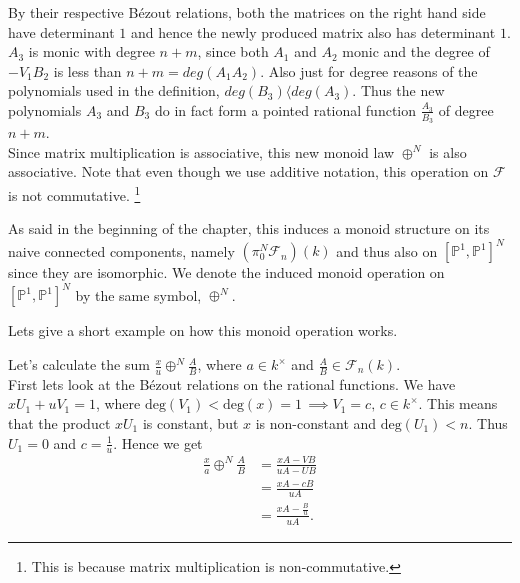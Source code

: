 %
\begin{remark}\label{Rm:N-sums work as expected}
By their respective Bézout relations, both the matrices on the right hand side have determinant \(1\) and hence the newly produced matrix also has determinant \(1\). \(A_3\) is monic with degree \(n+m\), since both \(A_1\) and \(A_2\) monic and the degree of \(-V_1 B_2\) is less than \(n+m = deg(A_1 A_2)\). Also just for degree reasons of the polynomials used in the definition, \(deg(B_3)\langle deg(A_3)\). Thus the new polynomials \(A_3\) and \(B_3\) do in fact form a pointed rational function \(\frac{A_3}{B_3}\) of degree \(n+m\). \\
%
Since matrix multiplication is associative, this new monoid law \(\oplus^N\) is also associative. %
Note that even though we use additive notation, this operation on \(\mathcal{F}\) is not commutative. \footnote{ This is because matrix multiplication is non-commutative.} 
\end{remark}
 
%
\begin{remark}\label{rm:induces monoid on conn components}
%
As said in the beginning of the chapter, this induces a monoid structure on its naive connected components, namely \((\pi_0^N\mathcal{F}_n)(k)\) and thus also on \([\mathbb{P}^1,\mathbb{P}^1]^N\) since they are isomorphic. We denote the induced monoid operation on \([\mathbb{P}^1,\mathbb{P}^1]^N\) by the same symbol, \(\oplus^N\). 
%
\end{remark}
%
Lets give a short example on how this monoid operation works.
\begin{example}\label{Ex:Computing easy N-sums}
Let's calculate the sum \(\frac{x}{u}\oplus^N\frac{A}{B}\), where \(a\in k^{\times}\) and \(\frac{A}{B}\in \mathcal{F}_n(k)\). \\

First lets look at the Bézout relations on the rational functions. We have \(xU_1 + u V_1 = 1\), where \(\text{deg}(V_1) < \text{deg}(x) = 1 \, \implies V_1 = c, \, c \in k^{\times}\). This means that the product \(xU_1\) is constant, but \(x\) is non-constant and \(\text{deg}(U_1) < n\). Thus \(U_1 = 0\) and \(c = \frac{1}{u}\). Hence we get
%
\begin{align*}
\frac{x}{a}\oplus^N\frac{A}{B} 
&= \frac{xA - VB}{uA -UB} \\ 
&= \frac{xA - cB}{uA} \\
&= \frac{xA-\frac{B}{u}}{uA}. 
\end{align*}
%
\end{example}
%
%
